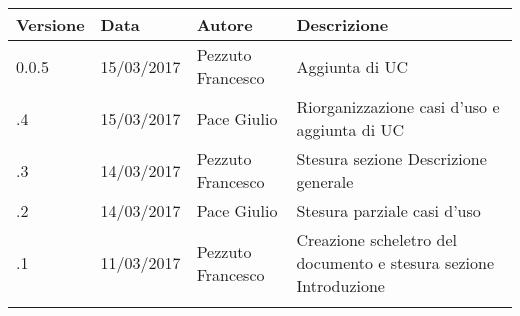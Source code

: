 \newpage
\begin{longtabu} to \textwidth {
	X[4,l,p]
	X[4,l,p]
	X[4,l,p]
	X[8,l,p]}
	\toprule
		 Versione & Data & Autore & Descrizione \\
		\midrule
		\endhead

		0.0.5 & 15/03/2017 & Pezzuto Francesco & Aggiunta di UC\\
		\addlinespace[0.2em]
		\midrule
		.4 & 15/03/2017 & Pace Giulio & Riorganizzazione casi d'uso e aggiunta di UC\\
		\addlinespace[0.2em]
		\midrule
		.3 & 14/03/2017 & Pezzuto Francesco & Stesura sezione Descrizione generale\\
		\addlinespace[0.2em]
		\midrule
		.2 & 14/03/2017 & Pace Giulio & Stesura parziale casi d'uso\\
		\addlinespace[0.2em]
		\midrule
		.1 & 11/03/2017 & Pezzuto Francesco & Creazione scheletro del documento e stesura
		sezione Introduzione\\
		\addlinespace[0.4em]
		
	\bottomrule
\end{longtabu}